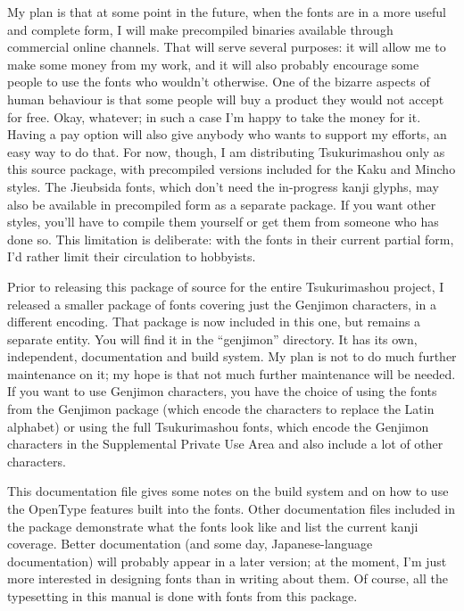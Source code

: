 \documentclass[14pt]{extarticle}
\begin{document}
My plan is that at some point in the future, when the fonts are in a more
useful and complete form, I will make precompiled binaries available through
commercial online channels.  That will serve several purposes: it will allow
me to make some money from my work, and it will also probably encourage some
people to use the fonts who wouldn't otherwise.  One of the bizarre aspects
of human behaviour is that some people will buy a product they would not
accept for free.  Okay, whatever; in such a case I'm happy to take the money
for it.  Having a pay option will also give anybody who wants to support my
efforts, an easy way to do that.  For now, though, I am distributing
Tsukurimashou only as this source package, with precompiled versions
included for the Kaku and Mincho styles.  The Jieubsida fonts, which don't
need the in-progress kanji glyphs, may also be available in precompiled form
as a separate package.  If you want other styles, you'll have to compile
them yourself or get them from someone who has done so.  This limitation is
deliberate: with the fonts in their current partial form, I'd rather limit
their circulation to hobbyists.

Prior to releasing this package of source for the entire Tsukurimashou
project, I released a smaller package of fonts covering just the Genjimon
characters, in a different encoding.  That package is now included in this
one, but remains a separate entity.  You will find it in the ``genjimon''
directory.  It has its own, independent, documentation and build system.  My
plan is not to do much further maintenance on it; my hope is that not much
further maintenance will be needed.  If you want to use Genjimon characters,
you have the choice of using the fonts from the Genjimon package (which
encode the characters to replace the Latin alphabet) or using the full
Tsukurimashou fonts, which encode the Genjimon characters in the
Supplemental Private Use Area and also include a lot of other characters.

This documentation file gives some notes on the build system and on how
to use the OpenType features built into the fonts.  Other documentation
files included in the package demonstrate what the fonts look like and
list the current kanji coverage.  Better documentation (and some day,
Japanese-language documentation) will probably appear in a later
version; at the moment, I'm just more interested in designing fonts
than in writing about them.  Of course, all the typesetting in this
manual is done with fonts from this package.
\end{document}
